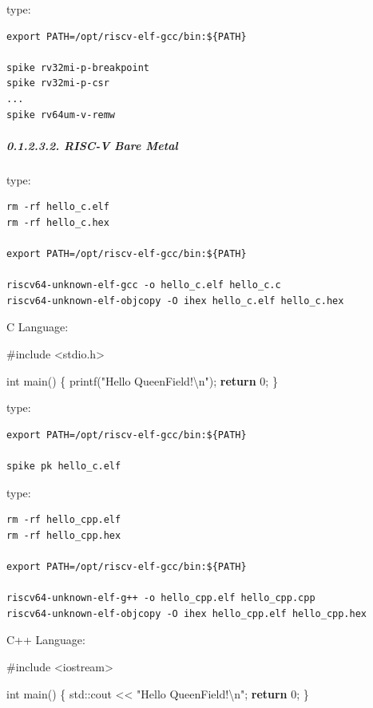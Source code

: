 \documentclass[
]{article}
\newenvironment{Shaded}{}{}
\newcommand{\BuiltInTok}[1]{#1}
\newcommand{\ControlFlowTok}[1]{\textcolor[rgb]{0.00,0.44,0.13}{\textbf{#1}}}
\newcommand{\DataTypeTok}[1]{\textcolor[rgb]{0.56,0.13,0.00}{#1}}
\newcommand{\DecValTok}[1]{\textcolor[rgb]{0.25,0.63,0.44}{#1}}
\newcommand{\ImportTok}[1]{#1}
\newcommand{\NormalTok}[1]{#1}
\newcommand{\PreprocessorTok}[1]{\textcolor[rgb]{0.74,0.48,0.00}{#1}}
\newcommand{\SpecialCharTok}[1]{\textcolor[rgb]{0.25,0.44,0.63}{#1}}
\newcommand{\StringTok}[1]{\textcolor[rgb]{0.25,0.44,0.63}{#1}}
\begin{document}
type:

\begin{verbatim}
export PATH=/opt/riscv-elf-gcc/bin:${PATH}

spike rv32mi-p-breakpoint
spike rv32mi-p-csr
...
spike rv64um-v-remw
\end{verbatim}

\hypertarget{risc-v-bare-metal-1}{%
\subparagraph{0.1.2.3.2. RISC-V Bare Metal}\label{risc-v-bare-metal-1}}

type:

\begin{verbatim}
rm -rf hello_c.elf
rm -rf hello_c.hex

export PATH=/opt/riscv-elf-gcc/bin:${PATH}

riscv64-unknown-elf-gcc -o hello_c.elf hello_c.c
riscv64-unknown-elf-objcopy -O ihex hello_c.elf hello_c.hex
\end{verbatim}

C Language:

\begin{Shaded}
\begin{Highlighting}[]
\PreprocessorTok{\#include }\ImportTok{\textless{}stdio.h\textgreater{}}

\DataTypeTok{int}\NormalTok{ main() \{}
\NormalTok{  printf(}\StringTok{"Hello QueenField!}\SpecialCharTok{\textbackslash{}n}\StringTok{"}\NormalTok{);}
  \ControlFlowTok{return} \DecValTok{0}\NormalTok{;}
\NormalTok{\}}
\end{Highlighting}
\end{Shaded}

type:

\begin{verbatim}
export PATH=/opt/riscv-elf-gcc/bin:${PATH}

spike pk hello_c.elf
\end{verbatim}

type:

\begin{verbatim}
rm -rf hello_cpp.elf
rm -rf hello_cpp.hex

export PATH=/opt/riscv-elf-gcc/bin:${PATH}

riscv64-unknown-elf-g++ -o hello_cpp.elf hello_cpp.cpp
riscv64-unknown-elf-objcopy -O ihex hello_cpp.elf hello_cpp.hex
\end{verbatim}

C++ Language:

\begin{Shaded}
\begin{Highlighting}[]
\PreprocessorTok{\#include }\ImportTok{\textless{}iostream\textgreater{}}

\DataTypeTok{int}\NormalTok{ main() \{}
  \BuiltInTok{std::}\NormalTok{cout \textless{}\textless{} }\StringTok{"Hello QueenField!}\SpecialCharTok{\textbackslash{}n}\StringTok{"}\NormalTok{;}
  \ControlFlowTok{return} \DecValTok{0}\NormalTok{;}
\NormalTok{\}}
\end{Highlighting}
\end{Shaded}
\end{document}
